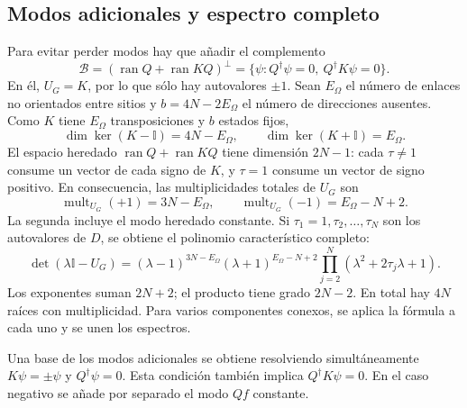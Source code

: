 \documentclass[11pt,a4paper]{article}
\newcommand{\Id}{\mathbb I}
\newcommand{\ran}{\operatorname{ran}}
\numberwithin{equation}{section}
\begin{document}
\subsection{Modos adicionales y espectro completo}
Para evitar perder modos hay que añadir el complemento
\begin{equation}
 \mathcal B=(\ran Q+\ran KQ)^\perp
 =\{\psi:Q^\dagger\psi=0,\ Q^\dagger K\psi=0\}.
\end{equation}
En él, $U_G=K$, por lo que sólo hay autovalores $\pm1$. Sean $E_\Omega$ el número de enlaces no orientados entre sitios y $b=4N-2E_\Omega$ el número de direcciones ausentes. Como $K$ tiene $E_\Omega$ transposiciones y $b$ estados fijos,
\begin{equation}
 \dim\ker(K-\Id)=4N-E_\Omega,\qquad
 \dim\ker(K+\Id)=E_\Omega.
\end{equation}
El espacio heredado $\ran Q+\ran KQ$ tiene dimensión $2N-1$: cada $\tau\ne1$ consume un vector de cada signo de $K$, y $\tau=1$ consume un vector de signo positivo. En consecuencia, las multiplicidades totales de $U_G$ son
\begin{equation}\label{eq:flat}
 \boxed{\operatorname{mult}_{U_G}(+1)=3N-E_\Omega,\qquad
 \operatorname{mult}_{U_G}(-1)=E_\Omega-N+2.}
\end{equation}
La segunda incluye el modo heredado constante. Si $\tau_1=1,\tau_2,\ldots,\tau_N$ son los autovalores de $D$, se obtiene el polinomio característico completo:
\begin{equation}\label{eq:fullpoly}
 \boxed{\det(\lambda\Id-U_G)=
 (\lambda-1)^{3N-E_\Omega}(\lambda+1)^{E_\Omega-N+2}
 \prod_{j=2}^N(\lambda^2+2\tau_j\lambda+1).}
\end{equation}
Los exponentes suman $2N+2$; el producto tiene grado $2N-2$. En total hay $4N$ raíces con multiplicidad. Para varios componentes conexos, se aplica la fórmula a cada uno y se unen los espectros.

Una base de los modos adicionales se obtiene resolviendo simultáneamente $K\psi=\pm\psi$ y $Q^\dagger\psi=0$. Esta condición también implica $Q^\dagger K\psi=0$. En el caso negativo se añade por separado el modo $Qf$ constante.
\end{document}
